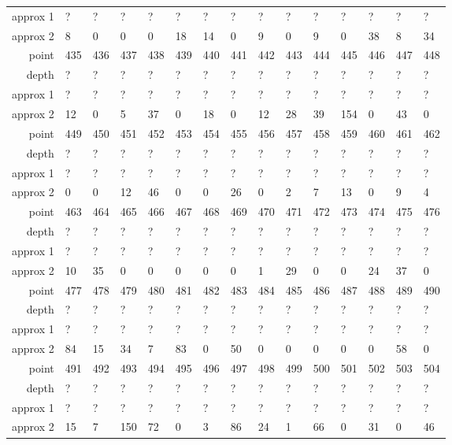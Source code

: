 \begin{center}
\begin{supertabular}{|r|l l l l l l l l l l l l l l|}
approx 1 & ? & ? & ? & ? & ? & ? & ? & ? & ? & ? & ? & ? & ? & ? \\
approx 2 & 8 & 0 & 0 & 0 & 18 & 14 & 0 & 9 & 0 & 9 & 0 & 38 & 8 & 34 \\
\hline
point & 435 & 436 & 437 & 438 & 439 & 440 & 441 & 442 & 443 & 444 & 445 & 446 & 447 & 448 \\
\hline
depth & ? & ? & ? & ? & ? & ? & ? & ? & ? & ? & ? & ? & ? & ? \\
approx 1 & ? & ? & ? & ? & ? & ? & ? & ? & ? & ? & ? & ? & ? & ? \\
approx 2 & 12 & 0 & 5 & 37 & 0 & 18 & 0 & 12 & 28 & 39 & 154 & 0 & 43 & 0 \\
\hline
point & 449 & 450 & 451 & 452 & 453 & 454 & 455 & 456 & 457 & 458 & 459 & 460 & 461 & 462 \\
\hline
depth & ? & ? & ? & ? & ? & ? & ? & ? & ? & ? & ? & ? & ? & ? \\
approx 1 & ? & ? & ? & ? & ? & ? & ? & ? & ? & ? & ? & ? & ? & ? \\
approx 2 & 0 & 0 & 12 & 46 & 0 & 0 & 26 & 0 & 2 & 7 & 13 & 0 & 9 & 4 \\
\hline
point & 463 & 464 & 465 & 466 & 467 & 468 & 469 & 470 & 471 & 472 & 473 & 474 & 475 & 476 \\
\hline
depth & ? & ? & ? & ? & ? & ? & ? & ? & ? & ? & ? & ? & ? & ? \\
approx 1 & ? & ? & ? & ? & ? & ? & ? & ? & ? & ? & ? & ? & ? & ? \\
approx 2 & 10 & 35 & 0 & 0 & 0 & 0 & 0 & 1 & 29 & 0 & 0 & 24 & 37 & 0 \\
\hline
point & 477 & 478 & 479 & 480 & 481 & 482 & 483 & 484 & 485 & 486 & 487 & 488 & 489 & 490 \\
\hline
depth & ? & ? & ? & ? & ? & ? & ? & ? & ? & ? & ? & ? & ? & ? \\
approx 1 & ? & ? & ? & ? & ? & ? & ? & ? & ? & ? & ? & ? & ? & ? \\
approx 2 & 84 & 15 & 34 & 7 & 83 & 0 & 50 & 0 & 0 & 0 & 0 & 0 & 58 & 0 \\
\hline
point & 491 & 492 & 493 & 494 & 495 & 496 & 497 & 498 & 499 & 500 & 501 & 502 & 503 & 504 \\
\hline
depth & ? & ? & ? & ? & ? & ? & ? & ? & ? & ? & ? & ? & ? & ? \\
approx 1 & ? & ? & ? & ? & ? & ? & ? & ? & ? & ? & ? & ? & ? & ? \\
approx 2 & 15 & 7 & 150 & 72 & 0 & 3 & 86 & 24 & 1 & 66 & 0 & 31 & 0 & 46 \\
\hline

\end{supertabular}
\end{center}
